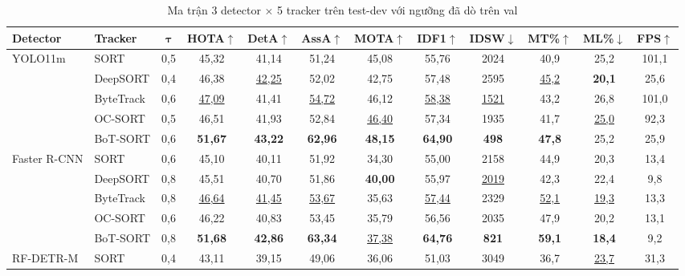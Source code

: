 \documentclass[fontsize=13pt,a4paper,oneside,parskip=false,numbers=noenddot,bibliography=totoc]{scrreprt}
\begin{document}
\begin{table}[!htbp]
  \centering
  \caption{Ma trận 3 detector $\times$ 5 tracker trên test-dev với ngưỡng đã dò trên val}
  \label{tab:ma-tran}
  \footnotesize
  \setlength{\tabcolsep}{2.3pt}
  \begin{tabular*}{\textwidth}{@{\extracolsep{\fill}}llcccccccccc@{}}
    \toprule
    \textbf{Detector} & \textbf{Tracker} & $\bm{\tau}$ & \textbf{HOTA}$\uparrow$ & \textbf{DetA}$\uparrow$ & \textbf{AssA}$\uparrow$ & \textbf{MOTA}$\uparrow$ & \textbf{IDF1}$\uparrow$ & \textbf{IDSW}$\downarrow$ & \textbf{MT\%}$\uparrow$ & \textbf{ML\%}$\downarrow$ & \textbf{FPS}$\uparrow$\\
    \midrule
    \multirow{5}{*}{YOLO11m} & SORT & 0,5 & 45,32 & 41,14 & 51,24 & 45,08 & 55,76 & 2024 & 40,9 & 25,2 & 101,1 \\
     & DeepSORT & 0,4 & 46,38 & \underline{42,25} & 52,02 & 42,75 & 57,48 & 2595 & \underline{45,2} & \textbf{20,1} & 25,6 \\
     & ByteTrack & 0,6 & \underline{47,09} & 41,41 & \underline{54,72} & 46,12 & \underline{58,38} & \underline{1521} & 43,2 & 26,8 & 101,0 \\
     & OC-SORT & 0,5 & 46,51 & 41,93 & 52,84 & \underline{46,40} & 57,34 & 1935 & 41,7 & \underline{25,0} & 92,3 \\
     & BoT-SORT & 0,6 & \textbf{51,67} & \textbf{43,22} & \textbf{62,96} & \textbf{48,15} & \textbf{64,90} & \textbf{498} & \textbf{47,8} & 25,2 & 25,9 \\
    \midrule
    \multirow{5}{*}{Faster R-CNN} & SORT & 0,6 & 45,10 & 40,11 & 51,92 & 34,30 & 55,00 & 2158 & 44,9 & 20,3 & 13,4 \\
     & DeepSORT & 0,8 & 45,51 & 40,70 & 51,86 & \textbf{40,00} & 55,97 & \underline{2019} & 42,3 & 22,4 & 9,8 \\
     & ByteTrack & 0,8 & \underline{46,64} & \underline{41,45} & \underline{53,67} & 35,63 & \underline{57,44} & 2329 & \underline{52,1} & \underline{19,3} & 13,3 \\
     & OC-SORT & 0,6 & 46,22 & 40,83 & 53,45 & 35,79 & 56,56 & 2035 & 47,9 & 20,2 & 13,1 \\
     & BoT-SORT & 0,8 & \textbf{51,68} & \textbf{42,86} & \textbf{63,34} & \underline{37,38} & \textbf{64,76} & \textbf{821} & \textbf{59,1} & \textbf{18,4} & 9,2 \\
    \midrule
    \multirow{5}{*}{RF-DETR-M} & SORT & 0,4 & 43,11 & 39,15 & 49,06 & 36,06 & 51,03 & 3049 & 36,7 & \underline{23,7} & 31,3 \\

\end{tabular*}
\end{table}
\end{document}
